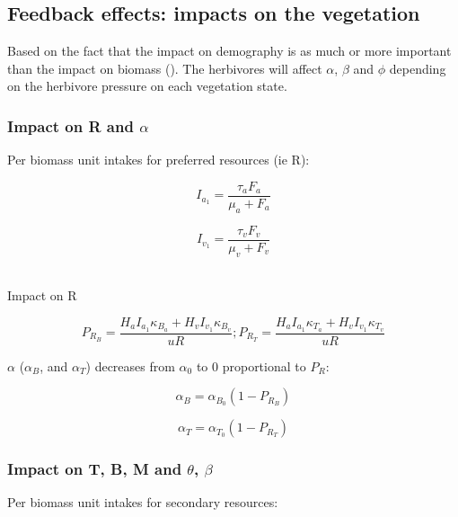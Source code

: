 \newpage


\subsection{Feedback effects: impacts on the vegetation}

Based on the fact that the impact on demography is as much or more important
than the impact on biomass (\cite{Moncrieff2014}). The herbivores will affect
$\alpha$, $\beta$ and $\phi$ depending on the herbivore pressure on each
vegetation state.

\subsubsection*{Impact on R and $\alpha$}

Per biomass unit intakes for preferred resources (ie R):

\[
I_{a_1} = \frac{\tau_a F_a}{\mu_a+ F_a}
\]

\[
I_{v_1} = \frac{\tau_v F_v}{\mu_v+ F_v}
\]

\\

Impact on R

\[
\boxed{
P_{R_B} = \frac{H_a I_{a_1}\kappa_{B_a} + H_v I_{v_1}\kappa_{B_v}}{uR}; 
P_{R_T} = \frac{H_a I_{a_1}\kappa_{T_a} + H_v I_{v_1}\kappa_{T_v}}{uR}
}
\]

$\alpha$ ($\alpha_B$, and $\alpha_T$) decreases from $\alpha_0$ to 0 
proportional to $P_R$:

\[
\alpha_B = \alpha_{B_0} (1- P_{R_B})
\]

\[
\alpha_T = \alpha_{T_0} (1- P_{R_T})
\]

\subsubsection*{Impact on T, B, M and $\theta$, $\beta$}

Per biomass unit intakes for secondary resources:

